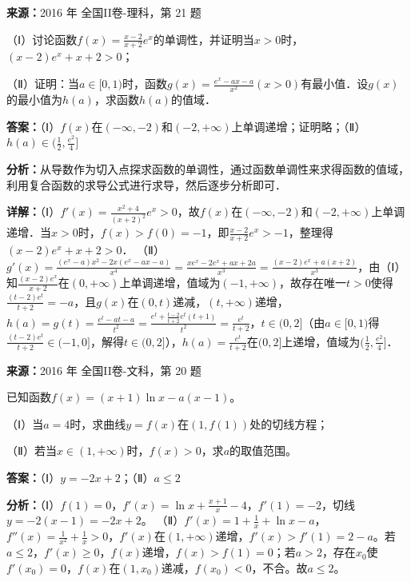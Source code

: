 \begin{question}[points=12]
\textbf{来源：}2016 年 全国II卷-理科，第 21 题\par
（Ⅰ）讨论函数$f(x)=\frac{x-2}{x+2}e^x$的单调性，并证明当$x>0$时，$(x-2)e^x+x+2>0$；

（Ⅱ）证明：当$a\in[0,1)$时，函数$g(x)=\frac{e^x-ax-a}{x^2}(x>0)$有最小值．设$g(x)$的最小值为$h(a)$，求函数$h(a)$的值域．
\begin{solution}
\textbf{答案：}（Ⅰ）$f(x)$在$(-\infty,-2)$和$(-2,+\infty)$上单调递增；证明略；（Ⅱ）$h(a)\in(\frac{1}{2},\frac{e^2}{4}]$

\textbf{分析：}从导数作为切入点探求函数的单调性，通过函数单调性来求得函数的值域，利用复合函数的求导公式进行求导，然后逐步分析即可．

\textbf{详解：}（Ⅰ）$f'(x)=\frac{x^2+4}{(x+2)^2}e^x>0$，故$f(x)$在$(-\infty,-2)$和$(-2,+\infty)$上单调递增．当$x>0$时，$f(x)>f(0)=-1$，即$\frac{x-2}{x+2}e^x>-1$，整理得$(x-2)e^x+x+2>0$．
（Ⅱ）$g'(x)=\frac{(e^x-a)x^2-2x(e^x-ax-a)}{x^4}=\frac{xe^x-2e^x+ax+2a}{x^3}=\frac{(x-2)e^x+a(x+2)}{x^3}$，由（Ⅰ）知$\frac{(x-2)e^x}{x+2}$在$(0,+\infty)$上单调递增，值域为$(-1,+\infty)$，故存在唯一$t>0$使得$\frac{(t-2)e^t}{t+2}=-a$，且$g(x)$在$(0,t)$递减，$(t,+\infty)$递增，$h(a)=g(t)=\frac{e^t-at-a}{t^2}=\frac{e^t+\frac{t-2}{t+2}e^t(t+1)}{t^2}=\frac{e^t}{t+2}$，$t\in(0,2]$（由$a\in[0,1)$得$\frac{(t-2)e^t}{t+2}\in(-1,0]$，解得$t\in(0,2]$），$h(a)=\frac{e^t}{t+2}$在$(0,2]$上递增，值域为$(\frac12,\frac{e^2}{4}]$．
\end{solution}
\end{question}

\begin{question}[points=12]
\textbf{来源：}2016 年 全国II卷-文科，第 20 题\par
已知函数$f(x)=(x+1)\ln x-a(x-1)$。

（Ⅰ）当$a=4$时，求曲线$y=f(x)$在$(1,f(1))$处的切线方程；

（Ⅱ）若当$x\in(1,+\infty)$时，$f(x)>0$，求$a$的取值范围。
\begin{solution}
\textbf{答案：}（Ⅰ）$y=-2x+2$；（Ⅱ）$a\le2$

\textbf{分析：}（Ⅰ）$f(1)=0$，$f'(x)=\ln x+\frac{x+1}{x}-4$，$f'(1)=-2$，切线$y=-2(x-1)=-2x+2$。
（Ⅱ）$f'(x)=1+\frac{1}{x}+\ln x-a$，$f''(x)=\frac{1}{x^2}+\frac{1}{x}>0$，$f'(x)$在$(1,+\infty)$递增，$f'(x)>f'(1)=2-a$。若$a\le2$，$f'(x)\ge0$，$f(x)$递增，$f(x)>f(1)=0$；若$a>2$，存在$x_0$使$f'(x_0)=0$，$f(x)$在$(1,x_0)$递减，$f(x_0)<0$，不合。故$a\le2$。
\end{solution}
\end{question}

